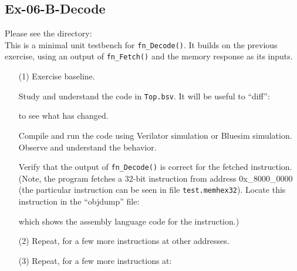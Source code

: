 
\subsection*{Ex-06-B-Decode}
\label{Ex-06-B-Decode}

Please see the directory:  \\
This is a minimal unit testbench for \verb|fn_Decode()|.  It builds on
the previous exercise, using an output of \verb|fn_Fetch()| and the
memory response as its inputs.

\begin{itemize}

\item[(1)] Exercise baseline.

    Study and understand the code in \verb|Top.bsv|.  It will be
    useful to ``diff'':
    to see what has changed.

    Compile and run the code using Verilator simulation or Bluesim
    simulation.  Observe and understand the behavior.

    Verify that the output of \verb|fn_Decode()| is correct for the
    fetched instruction.  (Note, the program fetches a 32-bit
    instruction from address 0x\_8000\_0000 (the particular
    instruction can be seen in file \verb|test.memhex32|).  Locate
    this instruction in the ``objdump'' file:


    which shows the assembly language code for the instruction.)

\item[(2)] Repeat, for a few more instructions at other addresses.

\item[(3)] Repeat, for a few more instructions at:


\end{itemize}
